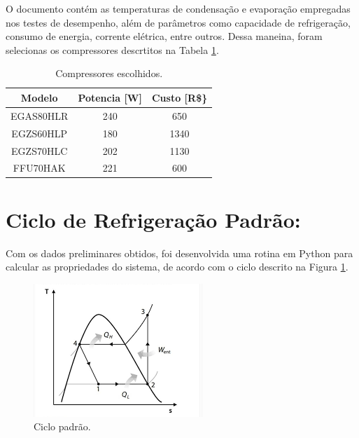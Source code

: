 \newpage

O documento contém as temperaturas de condensação e evaporação empregadas nos testes de desempenho, além de parâmetros como capacidade de refrigeração, consumo de energia, corrente elétrica, entre outros. Dessa maneina, foram selecionas os compressores descrtitos na Tabela \ref{tab:compressores escolhidos}.


\begin{table}[ht]
\centering
\begin{tabular}{|c|c|c|}
\hline
Modelo    & Potencia {[}W{]} & Custo {[}R\$\} \\ \hline
EGAS80HLR & 240              & 650            \\ \hline
EGZS60HLP & 180              & 1340           \\ \hline
EGZS70HLC & 202              & 1130           \\ \hline
FFU70HAK  & 221              & 600            \\ \hline
\end{tabular}
\caption{Compressores escolhidos.}
\label{tab:compressores escolhidos}
\end{table}

\section{Ciclo de Refrigeração Padrão:}

Com os dados preliminares obtidos, foi desenvolvida uma rotina em Python para calcular as propriedades do sistema, de acordo com o ciclo descrito na Figura \ref{fig:ciclo padrão}. 

\begin{figure}
    \centering
    \includegraphics[width=0.6\linewidth]{Imagens/Desenvolvimento/Diagrama.png}
    \caption{Ciclo padrão.}
    \label{fig:ciclo padrão}
\end{figure}

